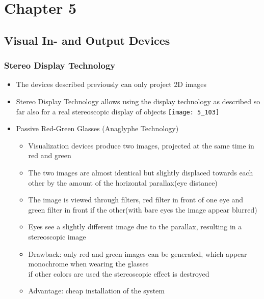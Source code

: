 \documentclass{standalone}
\begin{document}
\section{Chapter 5}

\subsection{Visual In- and Output Devices}

\subsubsection*{Stereo Display Technology}

\begin{itemize}
	\item The devices described previously can only project 2D images
	\item Stereo Display Technology allows using the display technology as described so far also for a real stereoscopic display of objects
	\texttt{[image: 5\_103]}
	
	\item Passive Red-Green Glasses (Anaglyphe Technology)
	\begin{itemize}
		\item Visualization devices produce two images, projected at the same time in red and green
		\item The two images are almost identical but slightly displaced towards each other by the amount of the horizontal parallax(eye distance)
		\item The image is viewed through filters, red filter in front of one eye and green filter in front if the other(with bare eyes the image appear blurred)
		\item Eyes see a slightly different image due to the parallax, resulting in a stereoscopic image
		\item Drawback: only red and green images can be generated, which appear monochrome when wearing the glasses \\
		if other colors are used the stereoscopic effect is destroyed
		\item Advantage: cheap installation of the system
	\end{itemize}


\end{itemize}
\end{document}
